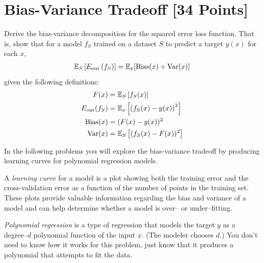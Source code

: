 
\newpage
\section{Bias-Variance Tradeoff [34 Points]}

\begin{problem}[5]
  Derive the bias-variance decomposition for the squared error loss function. That is, show that for a model $f_S$ trained on a dataset $S$ to predict a target $y(x)$ for each $x$,
  \begin{align*}
    \mathbb{E}_S \left[E_\text{out}\left(f_S\right)\right] = \mathbb{E}_x[\operatorname{Bias}(x) + \operatorname{Var}(x)]
  \end{align*}
  given the following definitions:
  \begin{align*}
    F(x) &= \mathbb{E}_S\left[f_S(x) \right] \\
    E_\text{out}(f_S) &= \mathbb{E}_x\left[\left(f_S(x) - y(x)\right)^2\right] \\
    \operatorname{Bias}(x) &= (F(x) - y(x))^2 \\
    \operatorname{Var}(x) &= \mathbb{E}_S\left[(f_S(x)-F(x))^2\right]
  \end{align*}
\end{problem}

\begin{solution}
  
\end{solution}

In the following problems you will explore the bias-variance tradeoff by producing learning curves for polynomial regression models.

A \emph{learning curve} for a model is a plot showing both the training error and the cross-validation error as a function of the number of points in the training set. These plots provide valuable information regarding the bias and variance of a model and can help determine whether a model is over-- or under--fitting.

\emph{Polynomial regression} is a type of regression that models the target $y$ as a degree--$d$ polynomial function of the input $x$. (The modeler chooses $d$.)  You don't need to know how it works for this problem, just know that it produces a polynomial that attempts to fit the data.

